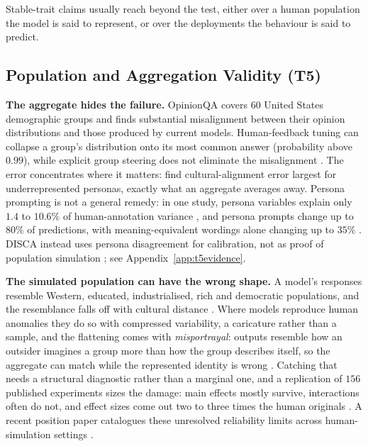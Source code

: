 \documentclass[11pt]{article}
\begin{document}
Stable-trait claims usually reach beyond the test, either over a human
population the model is said to represent, or over the deployments the
behaviour is said to predict.

\subsection{Population and Aggregation Validity (T5)}
\label{sec:t5}

\textbf{The aggregate hides the failure.} OpinionQA covers $60$ United States
demographic groups and finds substantial misalignment between their opinion
distributions and those produced by current models. Human-feedback tuning can
collapse a group's distribution onto its most common answer (probability above
$0.99$), while explicit group steering does not eliminate the misalignment
\cite{santurkar2023whose}. The error concentrates where it matters:
\citet{alkhamissi2024investigating} find cultural-alignment error largest for
underrepresented personas, exactly what an aggregate averages away. Persona
prompting is not a general remedy: in one study, persona variables explain only
$1.4$ to $10.6\%$ of
human-annotation variance \cite{hucollier2024persona}, and persona prompts
change up to $80\%$ of predictions, with meaning-equivalent wordings alone
changing up to $35\%$ \cite{beck2024sensitivity}.
DISCA instead uses persona disagreement for calibration, not as proof of
population simulation \cite{huynh2026disca}; see Appendix~\ref{app:t5evidence}.

\textbf{The simulated population can have the wrong shape.} A model's responses
resemble Western, educated, industrialised, rich and democratic populations, and
the resemblance falls off with cultural distance
\cite{atari2023which,henrich2010weirdest}. Where models reproduce human anomalies
they do so with compressed variability, a caricature rather than a sample, and the
flattening comes with \emph{misportrayal}: outputs resemble how an outsider
imagines a group more than how the group describes itself, so the aggregate can
match while the represented identity is wrong
\cite{aher2023turing,mei2024behavioral,wang2025misportray}. Catching that needs a
structural diagnostic rather than a marginal one, and a replication of $156$
published experiments sizes the damage: main effects mostly survive, interactions
often do not, and effect sizes come out two to three times the human originals
\cite{li2025silicon,cui2024replace,gui2023causal}. A recent position paper
catalogues these unresolved reliability limits across human-simulation settings
\cite{qwang2025reliable}.
\end{document}
